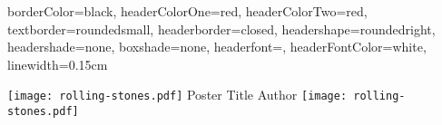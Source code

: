 \documentclass[a0paper,landscape]{baposter}
\begin{document}
\begin{poster}
{%
%
%
%
%
%                                
%
%
%
%
%
%
borderColor=black,
headerColorOne=red,
headerColorTwo=red,
textborder=roundedsmall,
headerborder=closed,
headershape=roundedright,
headershade=none,
boxshade=none,
headerfont=\sc,
headerFontColor=white,
linewidth=0.15cm
}
  
{\texttt{[image: rolling-stones.pdf]}} %
{Poster Title}
{Author}
{\texttt{[image: rolling-stones.pdf]}}
  
\end{poster}
\end{document}
